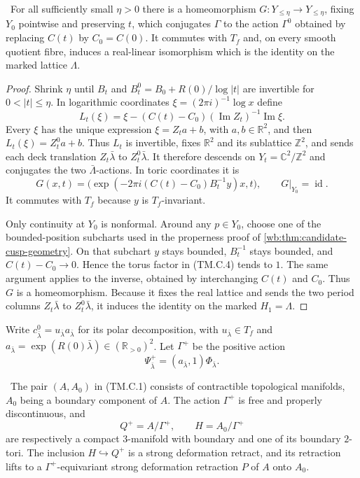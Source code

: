 \begin{lemma}\label{mapsI:top:lem:collapse-straightening}
\ For all sufficiently small $\eta>0$ there is a homeomorphism
$G:Y_{\leq\eta}\to Y_{\leq\eta}$, fixing $Y_0$ pointwise and preserving
$t$, which conjugates $\Gamma$ to the action $\Gamma^0$ obtained by replacing
$C(t)$ by $C_0=C(0)$.  It commutes with $T_f$ and, on every smooth quotient
fibre, induces a real-linear isomorphism which is the identity on the marked
lattice $\Lambda$.
\end{lemma}

\begin{proof}
Shrink $\eta$ until $B_t$ and
$B_t^0=B_0+R(0)/\log|t|$ are invertible for $0<|t|\leq\eta$.  In logarithmic
coordinates $\xi=(2\pi i)^{-1}\log x$ define
\[
 L_t(\xi)=\xi-(C(t)-C_0)(\operatorname{Im}Z_t)^{-1}
                         \operatorname{Im}\xi.
\tag{TM.C.3}
\]
Every $\xi$ has the unique expression $\xi=Z_ta+b$, with
$a,b\in\mathbb R^2$, and then $L_t(\xi)=Z_t^0a+b$.  Thus $L_t$ is invertible,
fixes $\mathbb R^2$ and its sublattice $\mathbb Z^2$, and sends each deck
translation $Z_t\bar\lambda$ to $Z_t^0\bar\lambda$.  It therefore descends
on $Y_t=\mathbb C^2/\mathbb Z^2$ and conjugates the two $\bar\Lambda$-actions.
In toric coordinates it is
\[
 G(x,t)=\bigl(\exp(-2\pi i(C(t)-C_0)B_t^{-1}y)x,t\bigr),
 \qquad G|_{Y_0}=\operatorname{id}.
\tag{TM.C.4}
\]
It commutes with $T_f$ because $y$ is $T_f$-invariant.

Only continuity at $Y_0$ is nonformal.  Around any $p\in Y_0$, choose one of
the bounded-position subcharts used in the properness proof of
\cref{wb:thm:candidate-cusp-geometry}.  On that subchart $y$ stays bounded,
$B_t^{-1}$ stays bounded, and $C(t)-C_0\to0$.  Hence the torus factor in
(TM.C.4) tends to $1$.  The same argument applies to the inverse, obtained by
interchanging $C(t)$ and $C_0$.  Thus $G$ is a homeomorphism.  Because it
fixes the real lattice and sends the two period columns $Z_t\bar\lambda$ to
$Z_t^0\bar\lambda$, it induces the identity on the marked $H_1=\Lambda$.
\end{proof}

Write $c^0_{\bar\lambda}=u_{\bar\lambda}a_{\bar\lambda}$ for its polar
decomposition, with $u_{\bar\lambda}\in T_f$ and
$a_{\bar\lambda}=\exp(R(0)\bar\lambda)\in(\mathbb R_{>0})^2$.  Let
$\Gamma^+$ be the positive action
\[
 \Psi^+_{\bar\lambda}=(a_{\bar\lambda},1)\Phi_{\bar\lambda}.
\tag{TM.C.5}
\]

\begin{lemma}\label{mapsI:top:lem:positive-collapse}
\ The pair $(A,A_0)$ in (TM.C.1) consists of contractible topological
manifolds, $A_0$ being a boundary component of $A$.  The action $\Gamma^+$ is
free and properly discontinuous, and
\[
 Q^+=A/\Gamma^+,\qquad H=A_0/\Gamma^+
\tag{TM.C.6}
\]
are respectively a compact $3$-manifold with boundary and one of its boundary
$2$-tori.  The inclusion $H\hookrightarrow Q^+$ is a strong deformation
retract, and its retraction lifts to a $\Gamma^+$-equivariant strong
deformation retraction $P$ of $A$ onto $A_0$.
\end{lemma}


